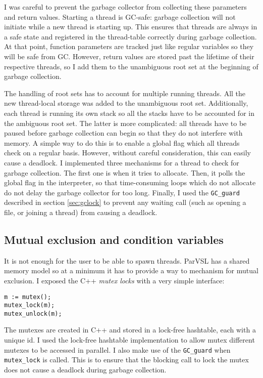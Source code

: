 I was careful to prevent the garbage collector from collecting these parameters and return values.
Starting a thread is GC-safe: garbage collection will not initiate while a new thread is starting up. This ensures
that threads are always in a safe state and registered in the thread-table correctly during garbage collection.
At that point, function parameters are tracked just like regular variables so they will be safe from GC.
However, return values are stored past the lifetime of their respective threads, so I add them
to the unambiguous root set at the beginning of garbage collection.

The handling of root sets has to account for multiple running threads. All the new
thread-local storage was added to the unambiguous root set. Additionally, each thread is running its
own stack so all the stacks have to be accounted for in the ambiguous root set. The latter is more complicated:
all threads have to be paused before garbage collection can begin so that they do not interfere
with memory. A simple way to do this is to enable a global flag which all threads check on a regular basis.
However, without careful consideration, this can easily cause a deadlock. I implemented three mechanisms
for a thread to check for garbage collection. The first one is when it tries to allocate. Then, it
polls the global flag in the interpreter, so that time-consuming loops which do not allocate do not
delay the garbage collector for too long. Finally, I used the \verb|GC_guard| described in section
\ref{sec:gclock} to prevent any waiting call (such as opening a file, or joining a thread) from
causing a deadlock.

\subsection{Mutual exclusion and condition variables}

It is not enough for the user to be able to spawn threads. ParVSL has a shared memory model so at a minimum
it has to provide a way to mechanism for mutual exclusion. I exposed the C++ \emph{mutex locks}
with a very simple interface:

\begin{verbatim}
m := mutex();
mutex_lock(m);
mutex_unlock(m);
\end{verbatim}

The mutexes are created in C++ and stored in a lock-free hashtable, each with a unique id. I used the lock-free
hashtable implementation to allow mutex different mutexes to be accessed in parallel. I also
make use of the \verb|GC_guard| when \verb|mutex_lock| is called. This is to ensure that the blocking
call to lock the mutex does not cause a deadlock during garbage collection.

